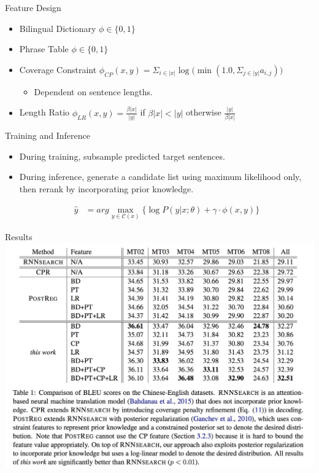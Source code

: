 \documentclass{beamer}
\begin{document}
\begin{frame}{Feature Design}{}
\begin{itemize}
\item Bilingual Dictionary $\phi \in \{0, 1\}$
\item Phrase Table $\phi \in \{0, 1\}$

\item Coverage Constraint $\phi_{CP}(x,y) = \Sigma_{i \in |x|} \log \big( \min (1.0, \Sigma_{j \in |y|} a_{i,j}) \big)$
\begin{itemize}
\item Dependent on sentence lengths.
\end{itemize}

\item Length Ratio $\phi_{LR}(x, y) = \frac{\beta|x|}{|y|}$ if $\beta|x| < |y|$ otherwise $\frac{|y|}{\beta|x|}$

\end{itemize}

\end{frame}

\begin{frame}{Training and Inference}{}
\begin{itemize}
\item During training, subsample predicted target sentences.
\item During inference, generate a candidate list using maximum likelihood only, then rerank by incorporating prior knowledge.

\begin{align*}
\hat{y} &= arg\max_{y \in \mathcal{C}(x)} \{ \log P(y|x;\theta) + \gamma \cdot \phi(x, y) \}
\end{align*}

\end{itemize}

\end{frame}

\begin{frame}{Results}{}
\centering
\includegraphics[width=\textheight]{results}
\end{frame}
\end{document}
